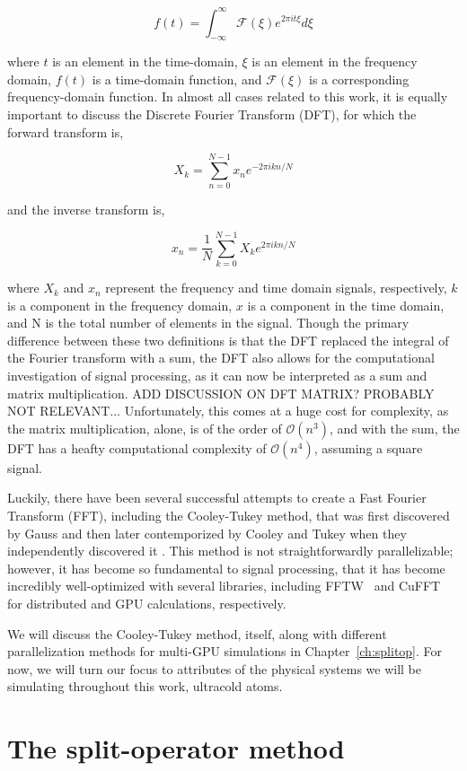 $$
f(t) = \int_{-\infty}^{\infty}\mathcal{F}(\xi)e^{2\pi i t \xi}d\xi
$$

\noindent where $t$ is an element in the time-domain, $\xi$ is an element in the frequency domain, $f(t)$ is a time-domain function, and $\mathcal{F}(\xi)$ is a corresponding frequency-domain function.
In almost all cases related to this work, it is equally important to discuss the Discrete Fourier Transform (DFT), for which the forward transform is,

$$
X_k = \sum_{n=0}^{N-1} x_n e^{-2 \pi i k n / N}
$$

\noindent and the inverse transform is,

$$
x_n = \frac{1}{N} \sum_{k=0}^{N-1} X_k e^{2 \pi i k n / N}
$$

\noindent where $X_k$ and $x_n$ represent the frequency and time domain signals, respectively, $k$ is a component in the frequency domain, $x$ is a component in the time domain, and N is the total number of elements in the signal.
Though the primary difference between these two definitions is that the DFT replaced the integral of the Fourier transform with a sum, the DFT also allows for the computational investigation of signal processing, as it can now be interpreted as a sum and matrix multiplication.
ADD DISCUSSION ON DFT MATRIX? PROBABLY NOT RELEVANT...
Unfortunately, this comes at a huge cost for complexity, as the matrix multiplication, alone, is of the order of $\mathcal{O}(n^3)$, and with the sum, the DFT has a heafty computational complexity of $\mathcal{O}(n^4)$, assuming a square signal.

Luckily, there have been several successful attempts to create a Fast Fourier Transform (FFT), including the Cooley-Tukey method, that was first discovered by Gauss and then later contemporized by Cooley and Tukey when they independently discovered it \cite{cooley1965}.
This method is not straightforwardly parallelizable; however, it has become so fundamental to signal processing, that it has become incredibly well-optimized with several libraries, including FFTW~\cite{frigo1998} and CuFFT~\cite{fatica2008} for distributed and GPU calculations, respectively.

We will discuss the Cooley-Tukey method, itself, along with different parallelization methods for multi-GPU simulations in Chapter~\ref{ch:splitop}.
For now, we will turn our focus to attributes of the physical systems we will be simulating throughout this work, ultracold atoms.


\section{The split-operator method}

